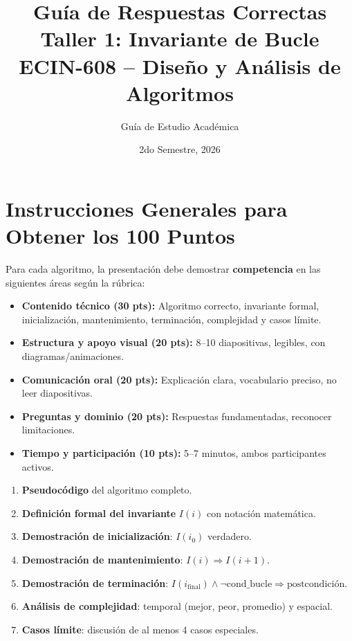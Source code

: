 \documentclass[11pt,a4paper]{article}
\title{Guía de Respuestas Correctas\\Taller 1: Invariante de Bucle\\ECIN-608 -- Diseño y Análisis de Algoritmos}
\author{Guía de Estudio Académica}
\date{2do Semestre, 2026}
\begin{document}
\maketitle
\tableofcontents
\newpage

\section{Instrucciones Generales para Obtener los 100 Puntos}

Para cada algoritmo, la presentación debe demostrar \textbf{competencia} en las siguientes áreas según la rúbrica:

\begin{itemize}
    \item \textbf{Contenido técnico (30 pts):} Algoritmo correcto, invariante formal, inicialización, mantenimiento, terminación, complejidad y casos límite.
    \item \textbf{Estructura y apoyo visual (20 pts):} 8--10 diapositivas, legibles, con diagramas/animaciones.
    \item \textbf{Comunicación oral (20 pts):} Explicación clara, vocabulario preciso, no leer diapositivas.
    \item \textbf{Preguntas y dominio (20 pts):} Respuestas fundamentadas, reconocer limitaciones.
    \item \textbf{Tiempo y participación (10 pts):} 5--7 minutos, ambos participantes activos.
\end{itemize}

\begin{tcolorbox}[colback=blue!5!white, colframe=blue!75!black, title={Estructura Obligatoria para Cada Algoritmo}]
\begin{enumerate}
    \item \textbf{Pseudocódigo} del algoritmo completo.
    \item \textbf{Definición formal del invariante} $I(i)$ con notación matemática.
    \item \textbf{Demostración de inicialización}: $I(i_0)$ verdadero.
    \item \textbf{Demostración de mantenimiento}: $I(i) \Rightarrow I(i+1)$.
    \item \textbf{Demostración de terminación}: $I(i_{\text{final}}) \wedge \neg\text{cond\_bucle} \Rightarrow \text{postcondición}$.
    \item \textbf{Análisis de complejidad}: temporal (mejor, peor, promedio) y espacial.
    \item \textbf{Casos límite}: discusión de al menos 4 casos especiales.
\end{enumerate}
\end{tcolorbox}
\end{document}
